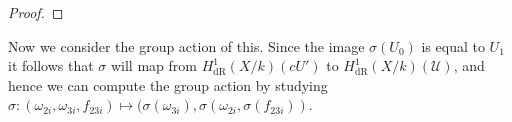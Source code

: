 \documentclass[draft, 11pt]{article} %
\theoremstyle{plain}
\theoremstyle{remark}
\newcommand{\cU}{{\mathcal U}}
\newcommand{\derhamhone}{H_{\text {dR}}^1(X/k)}
\begin{document}
\begin{proof}
\end{proof}

Now we consider the group action of this.
Since the image $\sigma (U_0)$ is equal to $U_1$ it follows that $\sigma$ will map from $\derhamhone(cU')$ to $\derhamhone(\cU)$, and hence we can compute the group action by studying $\sigma \colon (\omega_{2i}, \omega_{3i}, f_{23i}) \mapsto (\sigma(\omega_{3i}), \sigma (\omega_{2i}, \sigma(f_{23i}))$.



\end{document}

